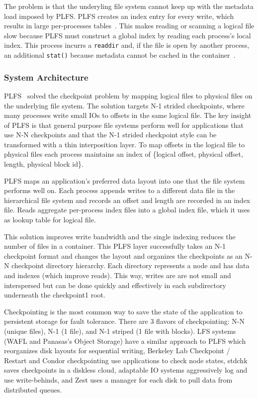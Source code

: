 The problem is that the underyling file system cannot keep up with the metadata
load imposed by PLFS. PLFS creates an index entry for every write, which
results in large per-processes tables~\cite{grider:pc17-diddlings}. This makes
reading or scanning a logical file slow because PLFS must construct a global
index by reading each process's local index. This process incurrs a
\texttt{readdir} and, if the file is open by another process, an additional
\texttt{stat()} because metadata cannot be cached in the
container~\cite{bent_plfs_2009}.

\subsubsection{System Architecture}
PLFS~\cite{bent_plfs_2009} solved the checkpoint problem by mapping logical
files to physical files on the underlying file system. The solution targets N-1
strided checkpoints, where many processes write small IOs to offsets in the
same logical file. The key insight of PLFS is that general purpose file systems
perform well for applications that use N-N checkpoints and that the N-1 strided
checkpoint style can be transformed with a thin interposition layer. To map
offsets in the logical file to physical files each process maintains an index
of \{logical offset, physical offset, length, physical block id\}. 

PLFS maps an application's preferred data layout into one that the file system
performs well on. Each process appends writes to a different data file in the
hierarchical file system and records an offset and length are recorded in an
index file. Reads aggregate per-process index files into a global index file,
which it uses as lookup table for logical file. 

This solution improves write bandwidth and the single indexing reduces the
number of files in a container. This PLFS layer successfully takes an N-1
checkpoint format and changes the layout and organizes the checkpoints as an
N-N checkpoint directory hierarchy. Each directory represents a node and has
data and indexes (which improve reads). This way, writes are are not small and
interspersed but can be done quickly and effectively in each subdirectory
underneath the checkpoint1 root.

Checkpointing is the most common way to save the state of the application to
persistent storage for fault tolerance. There are 3 flavors of checkpointing:
N-N (unique files), N-1 (1 file), and N-1 striped (1 file with blocks). LFS
systems (WAFL and Panasas's Object Storage) have a similar approach to PLFS
which reorganizes disk layouts for sequential writing, Berkeley Lab Checkpoint
/ Restart and Condor checkpointing use applications to check node states,
stdchk saves checkpoints in a  diskless cloud, adaptable IO systems
aggressively log and use write-behinds, and Zest uses a manager for each disk
to pull data from distributed queues.


